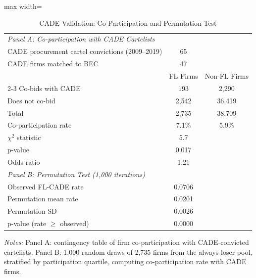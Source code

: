 \begin{table}[htbp]
\centering
\caption{CADE Validation: Co-Participation and Permutation Test}
\label{tab:cade_permutation}
\begin{adjustbox}{max width=\textwidth}
\begin{threeparttable}
\small
\begin{tabular}{lcc}
\toprule
\midrule
\textit{Panel A: Co-participation with CADE Cartelists} & & \\
CADE procurement cartel convictions (2009--2019) & 65 & \\
CADE firms matched to BEC & 47 & \\
\midrule
 & FL Firms & Non-FL Firms \\
\cmidrule(lr){2-3}
Co-bids with CADE & 193 & 2,290 \\
Does not co-bid & 2,542 & 36,419 \\
Total & 2,735 & 38,709 \\
Co-participation rate & 7.1\% & 5.9\% \\
\midrule
$\chi^2$ statistic & 5.7 & \\
p-value & 0.017 & \\
Odds ratio & 1.21 & \\
\midrule
\textit{Panel B: Permutation Test (1,000 iterations)} & & \\
Observed FL-CADE rate & 0.0706 & \\
Permutation mean rate & 0.0201 & \\
Permutation SD & 0.0026 & \\
p-value (rate $\geq$ observed) & 0.0000 & \\
\bottomrule
\end{tabular}
\begin{tablenotes}
\small
\item \textit{Notes:} Panel A: contingency table of firm co-participation
with CADE-convicted cartelists. Panel B: 1,000 random draws of
2,735 firms from the always-loser pool, stratified by participation
quartile, computing co-participation rate with CADE firms.
\end{tablenotes}
\end{threeparttable}
\end{adjustbox}
\end{table}
